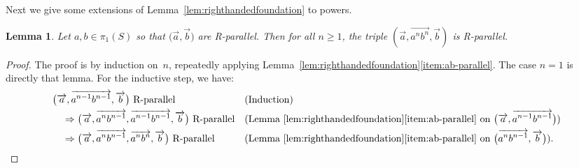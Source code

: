 \documentclass[11pt]{amsart}
\newcommand{\ora}[1]{\overrightarrow{#1}}
\numberwithin{equation}{section}
\numberwithin{figure}{section}
\newtheorem{lemma}[theorem]{Lemma}
\theoremstyle{definition}
\theoremstyle{plain}
\begin{document}
Next we give some extensions of Lemma~\ref{lem:righthandedfoundation}
to powers.
\begin{lemma}
  Let  $a,b \in \pi_1(S)$ so that $\bigl(\ora{a},\ora{b}\bigr)$ are
  R-parallel. Then for all
  $n \ge 1$, the triple $(\ora{a},\ora{a^n b^n}, \ora{b})$ is R-parallel.
  \label{lem:powers_parallel}
\end{lemma}
\begin{proof}
The proof is by induction on~$n$, repeatedly applying
Lemma~\ref{lem:righthandedfoundation}\ref{item:ab-parallel}. The case
$n=1$ is directly that lemma.
For the inductive step, we have:
\begin{align*}
  &\bigl(\ora{a},\ora{a^{n-1}b^{n-1}},\ora{b}\bigr)\text{ R-parallel}
    &&\text{(Induction)}\\
  &\quad\Rightarrow
    \bigl(\ora{a},\ora{a^n b^{n-1}},\ora{a^{n-1}b^{n-1}},\ora{b}\bigr)\text{ R-parallel}
    &&\text{(Lemma~\ref{lem:righthandedfoundation}\ref{item:ab-parallel} on
$\bigl(\ora{a},\ora{a^{n-1}b^{n-1}}\bigr)$)}\\
  &\quad\Rightarrow
    \bigl(\ora{a},\ora{a^n b^{n-1}},\ora{a^n b^n},\ora{b}\bigr)\text{ R-parallel}
    &&\text{(Lemma~\ref{lem:righthandedfoundation}\ref{item:ab-parallel} on
$\bigl(\ora{a^n b^{n-1}},\ora{b}\bigr)$)}.
\qedhere
\end{align*}
\end{proof}
\end{document}
